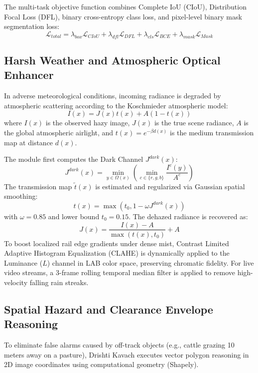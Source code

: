 \documentclass[conference]{IEEEtran}
\begin{document}
The multi-task objective function combines Complete IoU (CIoU), Distribution Focal Loss (DFL), binary cross-entropy class loss, and pixel-level binary mask segmentation loss:
\begin{equation}
\mathcal{L}_{total} = \lambda_{box} \mathcal{L}_{CIoU} + \lambda_{dfl} \mathcal{L}_{DFL} + \lambda_{cls} \mathcal{L}_{BCE} + \lambda_{mask} \mathcal{L}_{Mask}
\end{equation}

\subsection{Harsh Weather and Atmospheric Optical Enhancer}
In adverse meteorological conditions, incoming radiance is degraded by atmospheric scattering according to the Koschmieder atmospheric model:
\begin{equation}
I(x) = J(x) t(x) + A(1 - t(x))
\end{equation}
where $I(x)$ is the observed hazy image, $J(x)$ is the true scene radiance, $A$ is the global atmospheric airlight, and $t(x) = e^{-\beta d(x)}$ is the medium transmission map at distance $d(x)$.

The module first computes the Dark Channel $J^{dark}(x)$:
\begin{equation}
J^{dark}(x) = \min_{y \in \Omega(x)} \left( \min_{c \in \{r,g,b\}} \frac{I^c(y)}{A^c} \right)
\end{equation}
The transmission map $\tilde{t}(x)$ is estimated and regularized via Gaussian spatial smoothing:
\begin{equation}
t(x) = \max\left( t_0, 1 - \omega J^{dark}(x) \right)
\end{equation}
with $\omega = 0.85$ and lower bound $t_0 = 0.15$. The dehazed radiance is recovered as:
\begin{equation}
J(x) = \frac{I(x) - A}{\max(t(x), t_0)} + A
\end{equation}
To boost localized rail edge gradients under dense mist, Contrast Limited Adaptive Histogram Equalization (CLAHE) is dynamically applied to the Luminance ($L$) channel in LAB color space, preserving chromatic fidelity. For live video streams, a 3-frame rolling temporal median filter is applied to remove high-velocity falling rain streaks.

\subsection{Spatial Hazard and Clearance Envelope Reasoning}
To eliminate false alarms caused by off-track objects (e.g., cattle grazing 10 meters away on a pasture), Drishti Kavach executes vector polygon reasoning in 2D image coordinates using computational geometry (Shapely).
\end{document}
